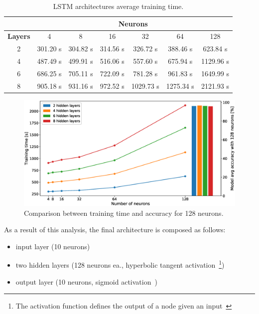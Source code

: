 \begin{table}
\centering
\begin{tabular}{|c|c|c|c|c|c|c|}
\hline
 & \multicolumn{6}{c|}{\textbf{Neurons}} \\ \hline
\textbf{Layers} & 4 & 8 & 16 & 32 & 64 & 128 \\ \hline
2 & 301.20 s & 304.82 s & 314.56 s & 326.72 s & 388.46 s & 623.84 s \\ \hline
4 & 487.49 s & 499.91 s & 516.06 s & 557.60 s & 675.94 s & 1129.96 s \\ \hline
6 & 686.25 s & 705.11 s & 722.09  s & 781.28 s & 961.83 s & 1649.99 s \\ \hline
8 & 905.18 s & 931.16 s & 972.52 s & 1029.73 s & 1275.34 s & 2121.93 s \\ \hline
\end{tabular}
\caption{LSTM architectures average training time.}
\label{tab:arch_timing}
\end{table}

\begin{figure}
\centering
\includegraphics[width=	\textwidth]{img/timing_cmp.eps}
\caption{Comparison between training time and accuracy for 128 neurons.	}
\label{fig:timing_cmp}
\end{figure}

As a result of this analysis, the final architecture is composed as follows:
\begin{itemize}
\item input layer (10 neurons)
\item two hidden layers (128 neurons ea., hyperbolic tangent activation~\footnote{\label{fn:activation_fun}The activation function defines the output of a node given an input~\cite{Goodfellow-et-al-2016}})
\item output layer (10 neurons, sigmoid activation~)
\end{itemize}

